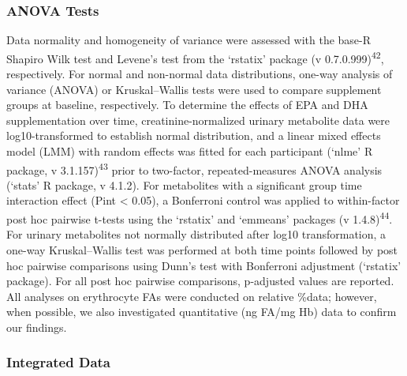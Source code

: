 \documentclass[journal=jacsat,manuscript=article]{achemso}
\begin{document}
\subsubsection{ANOVA Tests}\label{anova-tests}

Data normality and homogeneity of variance were assessed with the base-R
Shapiro Wilk test and Levene's test from the `rstatix' package (v
0.7.0.999)\textsuperscript{42}, respectively. For normal and non-normal
data distributions, one-way analysis of variance (ANOVA) or
Kruskal--Wallis tests were used to compare supplement groups at
baseline, respectively. To determine the effects of EPA and DHA
supplementation over time, creatinine-normalized urinary metabolite data
were log10-transformed to establish normal distribution, and a linear
mixed effects model (LMM) with random effects was fitted for each
participant (`nlme' R package, v 3.1.157)\textsuperscript{43} prior to
two-factor, repeated-measures ANOVA analysis (`stats' R package, v
4.1.2). For metabolites with a significant group time interaction effect
(Pint \textless{} 0.05), a Bonferroni control was applied to
within-factor post hoc pairwise t-tests using the `rstatix' and
`emmeans' packages (v 1.4.8)\textsuperscript{44}. For urinary
metabolites not normally distributed after log10 transformation, a
one-way Kruskal--Wallis test was performed at both time points followed
by post hoc pairwise comparisons using Dunn's test with Bonferroni
adjustment (`rstatix' package). For all post hoc pairwise comparisons,
p-adjusted values are reported. All analyses on erythrocyte FAs were
conducted on relative \%data; however, when possible, we also
investigated quantitative (ng FA/mg Hb) data to confirm our findings.

\subsubsection{Integrated Data}\label{integrated-data}
\end{document}
